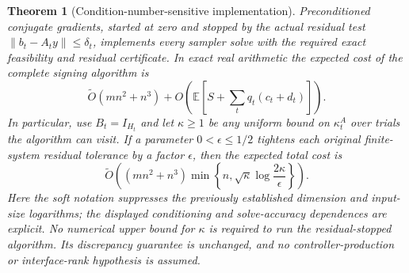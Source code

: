 \documentclass[11pt]{amsart}
\newtheorem{theorem}{Theorem}[section]
\theoremstyle{definition}\newtheorem{definition}[theorem]{Definition}
\theoremstyle{remark}\newtheorem{remark}[theorem]{Remark}
\numberwithin{equation}{section}
\begin{document}
\begin{theorem}[Condition-number-sensitive implementation]\label{ifc:thm:kappa}
Preconditioned conjugate gradients, started at zero and stopped by the
actual residual test $\|b_t-A_ty\|\le\delta_t$, implements every sampler
solve with the required exact feasibility and residual certificate.
In exact real arithmetic the expected cost of the complete signing
algorithm is
\begin{equation}\label{ifc:eq:kappa-sum}
 \widetilde O(mn^2+n^3)+
 O\!\left(\mathbb E\left[S+\sum_t q_t(c_t+d_t)\right]\right).
\end{equation}
In particular, use $B_t=I_{H_t}$ and let $\kappa\ge1$ be any uniform
bound on $\kappa_t^A$ over trials the algorithm can visit. If a parameter
$0<\epsilon\le1/2$ tightens each original finite-system residual
tolerance by a factor $\epsilon$, then the expected total cost is
\begin{equation}\label{ifc:eq:kappa-uniform}
 \widetilde O\!\left((mn^2+n^3)
      \min\left\{n,\sqrt\kappa\log\frac{2\kappa}{\epsilon}\right\}\right).
\end{equation}
Here the soft notation suppresses the previously established dimension
and input-size logarithms; the displayed conditioning and solve-accuracy
dependences are explicit. No numerical upper bound for $\kappa$ is
required to run the residual-stopped algorithm. Its discrepancy guarantee
is unchanged, and no controller-production or interface-rank hypothesis
is assumed.
\end{theorem}
\end{document}
